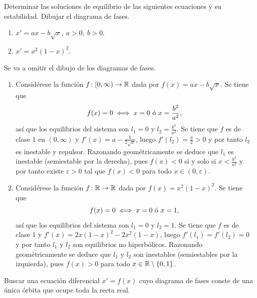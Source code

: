 \documentclass[11pt]{report}
\begin{document}
\begin{exercise}
    Determinar las soluciones de equilibrio de las siguientes ecuaciones y su estabilidad. Dibujar el diagrama de fases.
    \begin{enumerate}
        \item $x' = ax-b\sqrt{x}, \ a > 0, \ b > 0$.
        \item $x' = x^2(1-x)^2$.
    \end{enumerate}
\end{exercise}

\begin{solution}
    Se va a omitir el dibujo de los diagramas de fases.
    \begin{enumerate}
        \item Considérese la función $f \colon [0,\infty) \to \mathbb R$ dada por $f(x) = ax-b\sqrt{x}$. Se tiene que
        \[f(x) = 0 \iff x = 0 \textup{ ó } x=\frac{b^2}{a^2}, \]
        así que los equilibrios del sistema son $l_1 = 0$ y $l_2 = \frac{b^2}{a^2}$. Se tiene que $f$ es de clase $1$ en $(0,\infty)$ y $f'(x) = a-\frac{b}{2\sqrt{x}}$, luego $f'(l_2) = \frac{a}{2} > 0$ y por tanto $l_2$ es inestable y repulsor. Razonando geométricamente se deduce que $l_1$ es inestable (semiestable por la derecha), pues $f(x) < 0$ si y solo si $x < \frac{b^2}{a^2}$ y por tanto existe $\varepsilon > 0$ tal que $f(x) < 0$ para todo $x \in (0,\varepsilon)$.
        \item Considérese la función $f \colon \mathbb R \to \mathbb R$ dada por $f(x) = x^2(1-x)^2$. Se tiene que
        \[f(x) = 0 \iff x = 0 \textup{ ó } x=1, \]
        así que los equilibrios del sistema son $l_1 = 0$ y $l_2 = 1$. Se tiene que $f$ es de clase $1$ y $f'(x) = 2x(1-x)^2-2x^2(1-x)$, luego $f'(l_1) = f'(l_2) = 0$ y por tanto $l_1$ y $l_2$ son equilibrios no hiperbólicos. Razonando geométricamente se deduce que $l_1$ y $l_2$ son inestables (semiestables por la izquierda), pues $f(x) > 0$ para todo $x \in \mathbb R\setminus\{0,1\}$.
    \end{enumerate}
\end{solution}

\begin{exercise}
    Buscar una ecuación diferencial $x'=f(x)$ cuyo diagrama de fases conste de una única órbita que ocupe toda la recta real.
\end{exercise}
\end{document}
